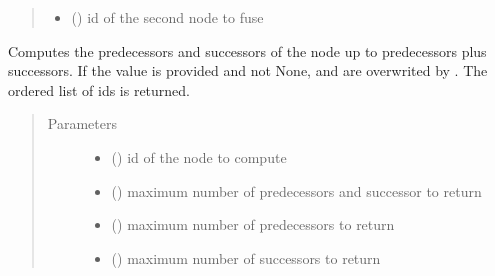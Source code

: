 \documentclass[letterpaper,10pt,english]{sphinxmanual}
\begin{document}
\begin{fulllineitems}
\begin{fulllineitems}
\begin{quote}
\begin{description}
\begin{itemize}
\item {} 
 () \textendash{} id of the second node to fuse

\end{itemize}

\end{description}\end{quote}

\end{fulllineitems}


\begin{fulllineitems}
\label{\detokenize{index:LineageTree.lineageTree.get_cycle}}
Computes the predecessors and successors of the node  up to
 predecessors plus  successors.
If the value  is provided and not None,
 and  are overwrited by .
The ordered list of ids is returned.
\begin{quote}\begin{description}
\item[{Parameters}] \leavevmode\begin{itemize}
\item {} 
 () \textendash{} id of the node to compute

\item {} 
 () \textendash{} maximum number of predecessors and successor to return

\item {} 
 () \textendash{} maximum number of predecessors to return

\item {} 
 () \textendash{} maximum number of successors to return


\end{itemize}
\end{description}
\end{quote}
\end{fulllineitems}
\end{fulllineitems}
\end{document}
